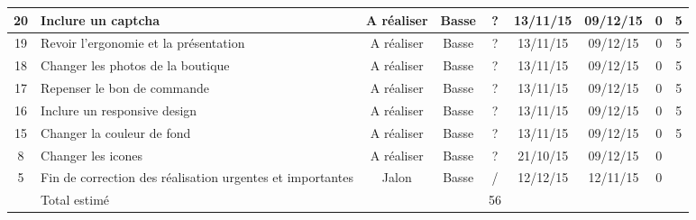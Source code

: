 \begin{tabular}{ | c | p{4cm} | c | c | c | c | c | c | c |  }
20 & Inclure un captcha & A réaliser & Basse & ? & 13/11/15 &
	09/12/15 & 0 & 5 \\ \hline
19 & Revoir l'ergonomie et la présentation & A réaliser & Basse & ? & 13/11/15
	& 09/12/15 & 0 & 5 \\ \hline
18 & Changer les photos de la boutique & A réaliser & Basse & ? & 13/11/15 &
	09/12/15 & 0 & 5 \\ \hline
17 & Repenser le bon de commande & A réaliser & Basse & ? & 13/11/15 & 09/12/15
	& 0 & 5 \\ \hline
16 & Inclure un responsive design & A réaliser & Basse & ? &
	13/11/15 & 09/12/15 & 0 & 5 \\ \hline
15 & Changer la couleur de fond & A réaliser & Basse & ? & 13/11/15 & 09/12/15
	& 0 & 5  \\ \hline
8 & Changer les icones & A réaliser & Basse & ? & 21/10/15 & 09/12/15 & 0 & \\
\hline

5 & Fin de correction des réalisation urgentes et importantes & Jalon & Basse &
	/ & 12/12/15 & 12/11/15 & 0 & \\ \hline

& Total estimé &  &  & 56 &  &  & & \\ \hline
 \end{tabular}